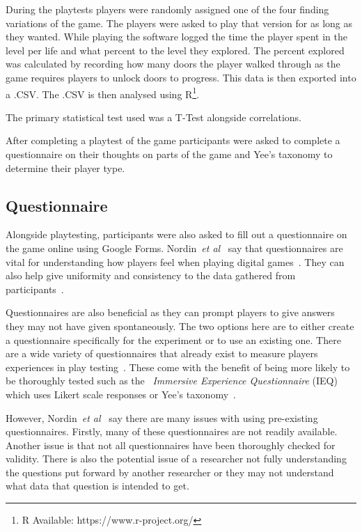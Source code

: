 \documentclass[journal]{IEEEtran}
\begin{document}
	During the playtests players were randomly assigned one of the four finding variations of the game. The players were asked to play that version for as long as they wanted. While playing the software logged the time the player spent in the level per life and what percent to the level they explored. The percent explored was calculated by recording how many doors the player walked through as the game requires players to unlock doors to progress. This data is then exported into a .CSV. The .CSV is then analysed using R\footnote[2]{R Available: https://www.r-project.org/}.
	
	
	The primary statistical test used was a T-Test alongside correlations.
	
	After completing a playtest of the game participants were asked to complete a questionnaire on their thoughts on parts of the game and Yee's taxonomy to determine their player type.
	
	\subsection{Questionnaire} \label{Questionnaire}
	
	Alongside playtesting, participants were also asked to fill out a questionnaire on the game online using Google Forms. Nordin~\textit{et al}~\cite{nordin2014} say that questionnaires are vital for understanding how players feel when playing digital games~\cite{nordin2014,Denisova2016}. They can also help give uniformity and consistency to the data gathered from participants~\cite{Denisova2016}.
	
	Questionnaires are also beneficial as they can prompt players to give answers they may not have given spontaneously. The two options here are to either create a questionnaire specifically for the experiment or to use an existing one. There are a wide variety of questionnaires that already exist to measure players experiences in play testing~\cite{nordin2014, Jennett2008}. These come with the benefit of being more likely to be thoroughly tested such as the~\textit{ Immersive Experience Questionnaire} (IEQ) which uses Likert scale responses or Yee's taxonomy~\cite{nordin2014, Jennett2008, Yee2006, Yee2012}.
	
	However, Nordin~\textit{et al}~\cite{nordin2014} say there are many issues with using pre-existing questionnaires. Firstly, many of these questionnaires are not readily available. Another issue is that not all questionnaires have been thoroughly checked for validity. There is also the potential issue of a researcher not fully understanding the questions put forward by another researcher or they may not understand what data that question is intended to get.
	
\end{document}
